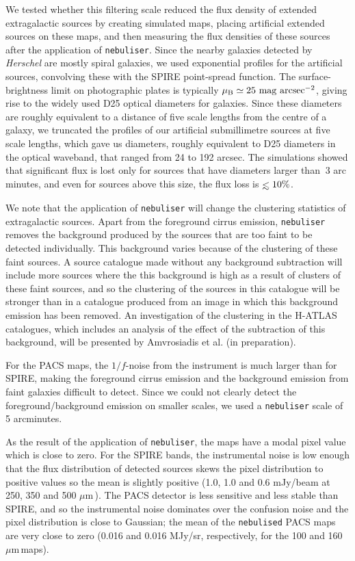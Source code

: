 \documentclass[useAMS,usenatbib]{mnras}
\def\lesssim{\mathrel{\hbox{\rlap{\hbox{\lower4pt\hbox{$\sim$}}}\hbox{$<$}}}}
\def\mic{ $\mu $m\,}
\begin{document}
We tested 
whether this filtering scale reduced the flux density of extended extragalactic
sources
by creating
simulated maps, placing artificial extended sources on these maps, and then
measuring the flux densities of these sources
after the application of
{\tt nebuliser}. 
Since the nearby galaxies detected by {\it Herschel} are mostly
spiral galaxies,
we used exponential profiles for the artificial sources, convolving
these with the
SPIRE point-spread function.
The surface-brightness limit on photographic plates
is typically
$\rm \mu_B \simeq 25\ mag\ arcsec^{-2}$, giving rise
to the widely used D25 optical diameters for galaxies.
Since these diameters are roughly equivalent to a distance of five scale
lengths from the centre of a galaxy, we truncated the profiles
of our artificial submillimetre sources at five scale lengths,
which gave us diameters, roughly equivalent to D25 diameters in the optical
waveband, that ranged from
24 to 192 arcsec.
The simulations showed that significant flux is lost only for
sources that have diameters larger than $~3$ arc minutes, and even for
sources above this size,
the flux loss is $\lesssim 10\%$.

We note that the application of {\tt nebuliser} will change
the clustering statistics of extragalactic sources.
Apart from the foreground cirrus emission, {\tt nebuliser} removes
the background produced by the sources that are too faint to be detected
individually. This background varies because of the clustering of these
faint sources.
A source catalogue made
without any background subtraction will include more sources where the
this background is high as a result of clusters of these faint sources, and so
the clustering of the sources in this catalogue will be stronger than in
a catalogue produced from an image in which this background emission has been
removed. An investigation of the clustering in the H-ATLAS catalogues,
which includes an analysis of the effect of the subtraction of this
background, will be presented by Amvrosiadis et al. (in preparation).

For the PACS maps, the $1/f$-noise from the instrument is much larger than
for SPIRE, making the foreground cirrus emission and the background
emission from faint galaxies difficult to detect. Since we could not
clearly detect the foreground/background emission on smaller
scales, we used a {\tt nebuliser} scale of 5 arcminutes.

As the result
of the application of {\tt nebuliser}, the maps have a modal pixel value which is close to
zero. For the SPIRE bands, the instrumental noise is low enough that
the flux distribution of detected sources skews the pixel distribution to
positive values so the mean is slightly positive (1.0, 1.0 and 0.6
mJy/beam at 250, 350 and 500 \mic).
The PACS detector is less sensitive and less stable than SPIRE, and so the
instrumental noise dominates over the confusion noise and the pixel
distribution is close to Gaussian; the mean of the {\tt nebulised} PACS
maps are very close to zero (0.016 and 0.016
MJy/sr, respectively, for the 100 and 160\mic maps). 
\end{document}
